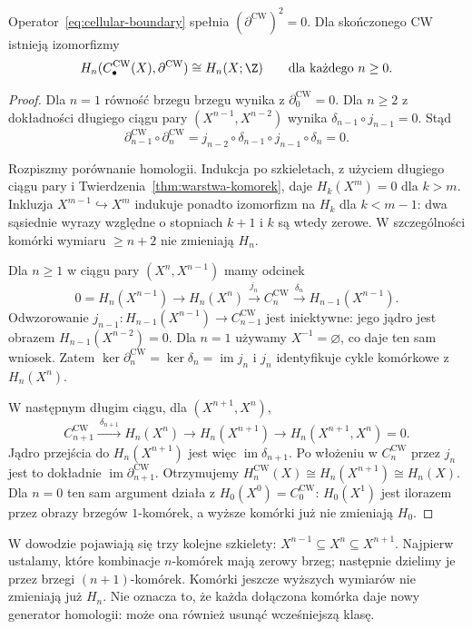 \begin{twierdzenie}
\label{thm:komorkowa-singularna}
Operator~\eqref{eq:cellular-boundary}
spełnia $(\partial^{\mathrm{CW}})^2=0$.
Dla skończonego CW istnieją
izomorfizmy
\[
 H_n(C_\bullet^{\mathrm{CW}}(X),
       \partial^{\mathrm{CW}})
 \cong H_n(X;\Z)
 \qquad\text{dla każdego }n\geq0.
\]
\end{twierdzenie}
\begin{proof}
Dla $n=1$ równość brzegu brzegu wynika z $\partial_0^{\mathrm{CW}}=0$.
Dla $n\geq2$ z dokładności długiego ciągu
pary $(X^{n-1},X^{n-2})$
wynika $\delta_{n-1}\circ j_{n-1}=0$.
Stąd
\[
 \partial^{\mathrm{CW}}_{n-1}\circ
 \partial^{\mathrm{CW}}_n
 =j_{n-2}\circ\delta_{n-1}\circ j_{n-1}\circ\delta_n=0.
\]

Rozpiszmy porównanie homologii.
Indukcja po szkieletach,
z użyciem długiego ciągu pary
i Twierdzenia~\ref{thm:warstwa-komorek},
daje $H_k(X^m)=0$ dla $k>m$.
Inkluzja $X^{m-1}\hookrightarrow X^m$
indukuje ponadto izomorfizm na
$H_k$ dla $k<m-1$: dwa sąsiednie
wyrazy względne o stopniach
$k+1$ i $k$ są wtedy zerowe.
W szczególności komórki wymiaru
$\geq n+2$ nie zmieniają $H_n$.

Dla $n\geq1$ w ciągu pary
$(X^n,X^{n-1})$ mamy odcinek
\[
 0=H_n(X^{n-1})\longrightarrow
 H_n(X^n)\xrightarrow{\ j_n\ }
 C_n^{\mathrm{CW}}
 \xrightarrow{\ \delta_n\ }
 H_{n-1}(X^{n-1}).
\]
Odwzorowanie $j_{n-1}:H_{n-1}(X^{n-1})
\to C_{n-1}^{\mathrm{CW}}$
jest iniektywne: jego jądro
jest obrazem
$H_{n-1}(X^{n-2})=0$.
Dla $n=1$ używamy
$X^{-1}=\varnothing$, co daje
ten sam wniosek.
Zatem $\ker\partial_n^{\mathrm{CW}}
=\ker\delta_n=\operatorname{im}j_n$
i $j_n$ identyfikuje cykle
komórkowe z $H_n(X^n)$.

W następnym długim ciągu,
dla $(X^{n+1},X^n)$,
\[
 C_{n+1}^{\mathrm{CW}}
 \xrightarrow{\ \delta_{n+1}\ }
 H_n(X^n)\longrightarrow
 H_n(X^{n+1})\longrightarrow
 H_n(X^{n+1},X^n)=0.
\]
Jądro przejścia do $H_n(X^{n+1})$
jest więc $\operatorname{im}\delta_{n+1}$.
Po włożeniu w $C_n^{\mathrm{CW}}$
przez $j_n$ jest to dokładnie
$\operatorname{im}\partial_{n+1}^{\mathrm{CW}}$.
Otrzymujemy
$H_n^{\mathrm{CW}}(X)\cong
H_n(X^{n+1})\cong H_n(X)$.
Dla $n=0$ ten sam argument działa
z $H_0(X^0)=C_0^{\mathrm{CW}}$:
$H_0(X^1)$ jest ilorazem przez
obrazy brzegów $1$-komórek,
a wyższe komórki już nie
zmieniają $H_0$.
\end{proof}

W dowodzie pojawiają się trzy kolejne szkielety:
$X^{n-1}\subseteq X^n\subseteq X^{n+1}$.
Najpierw ustalamy, które kombinacje $n$-komórek mają zerowy brzeg;
następnie dzielimy je przez brzegi $(n+1)$-komórek.
Komórki jeszcze wyższych wymiarów nie zmieniają już $H_n$.
Nie oznacza to, że każda dołączona komórka daje nowy generator
homologii: może ona również usunąć wcześniejszą klasę.

